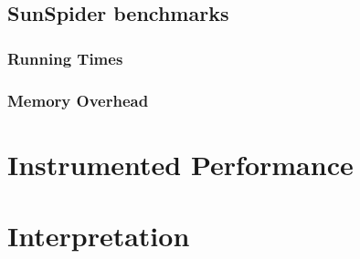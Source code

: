 \subsection{SunSpider benchmarks}

\subsubsection{Running Times}



\subsubsection{Memory Overhead}


\section{Instrumented Performance}

\section{Interpretation}

